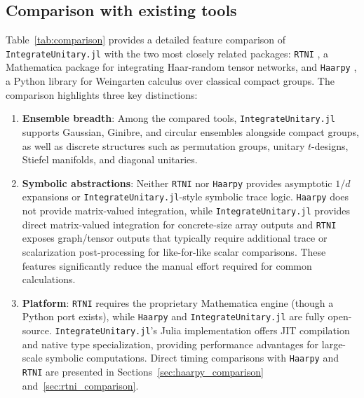 \documentclass[manuscript,screen]{acmart}
\begin{document}
\subsection{Comparison with existing tools}
\label{sec:comparison}
Table~\ref{tab:comparison} provides a detailed feature comparison of
\texttt{IntegrateUnitary.jl} with the two most closely related packages: \texttt{RTNI}
\cite{fukuda2019rtni}, a Mathematica package for integrating Haar-random tensor
networks, and \texttt{Haarpy} \cite{cardin2024haarpy}, a Python library for
Weingarten calculus over classical compact groups. The comparison highlights
three key distinctions:
\begin{enumerate}
    \item \textbf{Ensemble breadth}: Among the compared tools,
    \texttt{IntegrateUnitary.jl} supports Gaussian, Ginibre, and circular ensembles
    alongside compact groups, as well as discrete structures such as
    permutation groups, unitary $t$-designs, Stiefel manifolds, and diagonal
    unitaries.
    \item \textbf{Symbolic abstractions}: Neither \texttt{RTNI} nor
    \texttt{Haarpy} provides asymptotic $1/d$ expansions or
    \texttt{IntegrateUnitary.jl}-style symbolic trace logic. \texttt{Haarpy} does not
    provide matrix-valued integration, while \texttt{IntegrateUnitary.jl} provides direct
    matrix-valued integration for concrete-size array outputs and
    \texttt{RTNI} exposes graph/tensor outputs that typically require
    additional trace or scalarization
    post-processing for like-for-like scalar comparisons. These features
    significantly reduce the manual effort required for common calculations.
    \item \textbf{Platform}: \texttt{RTNI} requires the proprietary Mathematica
    engine (though a Python port exists), while \texttt{Haarpy} and
    \texttt{IntegrateUnitary.jl} are fully open-source. \texttt{IntegrateUnitary.jl}'s Julia
    implementation offers JIT compilation and native type specialization,
    providing performance advantages for large-scale symbolic computations.
    Direct timing comparisons with \texttt{Haarpy} and \texttt{RTNI} are
    presented in Sections~\ref{sec:haarpy_comparison}
    and~\ref{sec:rtni_comparison}.
\end{enumerate}
\end{document}
